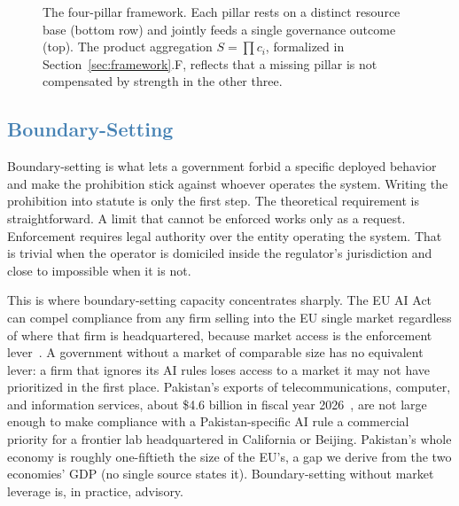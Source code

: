 \documentclass[journal]{IEEEtran}
\begin{document}
\begin{figure}[H]
{%
}
\caption{The four-pillar framework. Each pillar rests on a distinct resource base (bottom row) and jointly feeds a single governance outcome (top). The product aggregation $S=\prod c_i$, formalized in Section~\ref{sec:framework}.F, reflects that a missing pillar is not compensated by strength in the other three.}
\label{fig:pillars}
\end{figure}

\subsection{\textcolor{steelblue}{Boundary-Setting}}

Boundary-setting is what lets a government forbid a specific deployed behavior and make the prohibition stick against whoever operates the system. Writing the prohibition into statute is only the first step. The theoretical requirement is straightforward. A limit that cannot be enforced works only as a request. Enforcement requires legal authority over the entity operating the system. That is trivial when the operator is domiciled inside the regulator's jurisdiction and close to impossible when it is not.

This is where boundary-setting capacity concentrates sharply. The EU AI Act can compel compliance from any firm selling into the EU single market regardless of where that firm is headquartered, because market access is the enforcement lever~\cite{euaiact2024}.
A government without a market of comparable size has no equivalent lever: a firm that ignores its AI rules loses access to a market it may not have prioritized in the first place. Pakistan's exports of telecommunications, computer, and information services, about \$4.6 billion in fiscal year 2026~\cite{sbp2026itexports},
are not large enough to make compliance with a Pakistan-specific AI rule a commercial priority for a frontier lab headquartered in California or Beijing. Pakistan's whole economy is roughly one-fiftieth the size of the EU's, a gap we derive from the two economies' GDP (no single source states it). Boundary-setting without market leverage is, in practice, advisory.
\end{document}
